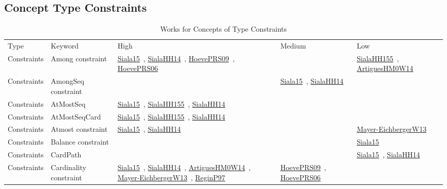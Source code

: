 \clearpage
\subsection{Concept Type Constraints}
\label{sec:Constraints}
{\scriptsize
\begin{longtable}{lp{3cm}>{\raggedright\arraybackslash}p{6cm}>{\raggedright\arraybackslash}p{6cm}>{\raggedright\arraybackslash}p{8cm}}
\rowcolor{white}\caption{Works for Concepts of Type Constraints}\\ \toprule
\rowcolor{white}Type & Keyword & High & Medium & Low\\ \midrule\endhead
\bottomrule
\endfoot
Constraints & Among constraint & \href{../cars/works/Siala15.pdf}{Siala15}~\cite{Siala15}, \href{../cars/works/SialaHH14.pdf}{SialaHH14}~\cite{SialaHH14}, \href{../cars/works/HoevePRS09.pdf}{HoevePRS09}~\cite{HoevePRS09}, \href{../cars/works/HoevePRS06.pdf}{HoevePRS06}~\cite{HoevePRS06} &  & \href{../cars/works/SialaHH155.pdf}{SialaHH155}~\cite{SialaHH155}, \href{../cars/works/ArtiguesHM0W14.pdf}{ArtiguesHM0W14}~\cite{ArtiguesHM0W14}\\
Constraints & AmongSeq constraint &  & \href{../cars/works/Siala15.pdf}{Siala15}~\cite{Siala15}, \href{../cars/works/SialaHH14.pdf}{SialaHH14}~\cite{SialaHH14} & \\
Constraints & AtMostSeq & \href{../cars/works/Siala15.pdf}{Siala15}~\cite{Siala15}, \href{../cars/works/SialaHH155.pdf}{SialaHH155}~\cite{SialaHH155}, \href{../cars/works/SialaHH14.pdf}{SialaHH14}~\cite{SialaHH14} &  & \\
Constraints & AtMostSeqCard & \href{../cars/works/Siala15.pdf}{Siala15}~\cite{Siala15}, \href{../cars/works/SialaHH155.pdf}{SialaHH155}~\cite{SialaHH155}, \href{../cars/works/SialaHH14.pdf}{SialaHH14}~\cite{SialaHH14} &  & \\
Constraints & Atmost constraint & \href{../cars/works/Siala15.pdf}{Siala15}~\cite{Siala15}, \href{../cars/works/SialaHH14.pdf}{SialaHH14}~\cite{SialaHH14} &  & \href{../cars/works/Mayer-EichbergerW13.pdf}{Mayer-EichbergerW13}~\cite{Mayer-EichbergerW13}\\
Constraints & Balance constraint &  &  & \href{../cars/works/Siala15.pdf}{Siala15}~\cite{Siala15}\\
Constraints & CardPath &  &  & \href{../cars/works/Siala15.pdf}{Siala15}~\cite{Siala15}, \href{../cars/works/SialaHH14.pdf}{SialaHH14}~\cite{SialaHH14}\\
Constraints & Cardinality constraint & \href{../cars/works/Siala15.pdf}{Siala15}~\cite{Siala15}, \href{../cars/works/SialaHH14.pdf}{SialaHH14}~\cite{SialaHH14}, \href{../cars/works/ArtiguesHM0W14.pdf}{ArtiguesHM0W14}~\cite{ArtiguesHM0W14}, \href{../cars/works/Mayer-EichbergerW13.pdf}{Mayer-EichbergerW13}~\cite{Mayer-EichbergerW13}, \href{../cars/works/ReginP97.pdf}{ReginP97}~\cite{ReginP97} & \href{../cars/works/HoevePRS09.pdf}{HoevePRS09}~\cite{HoevePRS09}, \href{../cars/works/HoevePRS06.pdf}{HoevePRS06}~\cite{HoevePRS06} & \\

\end{longtable}}
